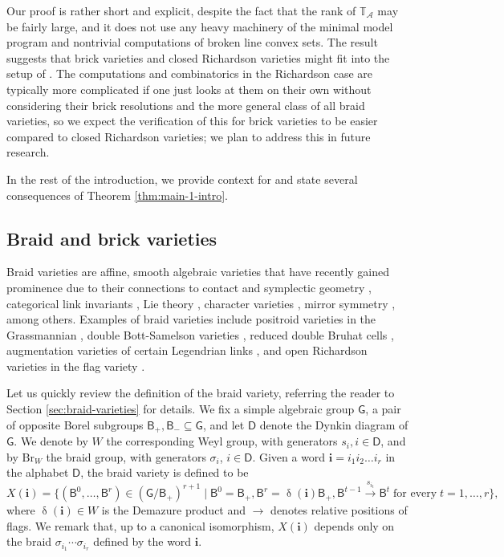 \documentclass[a4paper, 11pt]{amsart}
\newcommand{\Br}{\mathrm{Br}}
\newcommand{\borel}{\mathsf{B}}
\newcommand{\flag}[1]{\mathsf{B}^{#1}}
\newcommand{\rel}[1]{\xrightarrow{#1}}
\newcommand{\word}[1]{\mathbf{#1}}
\DeclareMathOperator{\dem}{\delta}
\newcommand{\group}{\mathsf{G}}
\newcommand{\dynkin}{\mathsf{D}}
\newcommand{\dil}[1]{\mathbb{T}_{#1}}
\theoremstyle{definition}
\begin{document}
Our proof is rather short and explicit, despite the fact that the rank of $\dil{\mathcal{A}}$ may be fairly large, and it does not use any heavy machinery of the minimal model program and nontrivial computations of broken line convex sets. The result suggests that brick varieties and closed Richardson varieties might fit into the setup of \cite{GHKK, BCMNC}. The computations and combinatorics in the Richardson case are typically more complicated if one just looks at them on their own without considering their brick resolutions and the more general class of all braid varieties, so we expect the verification of this for brick varieties to be easier compared to closed Richardson varieties; we plan to address this in future research.

In the rest of the introduction, we provide context for and state several consequences of Theorem \ref{thm:main-1-intro}.

\subsection{Braid and brick varieties} Braid varieties are affine, smooth algebraic varieties that have recently gained prominence due to their connections to contact and symplectic geometry \cite{ACSHLLW, CasalsWeng, CGGS1}, categorical link invariants \cite{CGGS2, Trinh}, Lie theory \cite{CGGLSS}, character varieties \cite{Mellit-character}, mirror symmetry \cite{CGGLSS, CGSS}, among others. Examples of braid varieties include positroid varieties in the Grassmannian \cite{GalashinLam-positroid}, double Bott-Samelson varieties \cite{SW}, reduced double Bruhat cells \cite{FominZelevinsky-Bruhat}, augmentation varieties of certain Legendrian links \cite{CGGS1}, and open Richardson varieties in the flag variety \cite{CGGLSS}. 

Let us quickly review the definition of the braid variety, referring the reader to Section \ref{sec:braid-varieties} for details. We fix a simple algebraic group $\group$, a pair of opposite Borel subgroups $\borel_{+}, \borel_{-} \subseteq \group$, and let $\dynkin$ denote the Dynkin diagram of $\group$. We denote by $W$ the corresponding Weyl group, with generators $s_{i}, i \in \dynkin$, and by $\Br_W$ the braid group, with generators $\sigma_i$, $i \in \dynkin$. Given a word $\word{i} = i_1i_2\dots i_r$ in the alphabet $\dynkin$, the braid variety is defined to be
\[
X(\word{i}) = \{(\flag{0}, \dots, \flag{r}) \in (\group/\borel_{+})^{r+1} \mid \flag{0} = \borel_{+}, \flag{r} = \dem(\word{i})\borel_{+}, \flag{t-1} \rel{s_{i_t}} \flag{t} \; \text{for every} \; t = 1, \dots, r\},
\]
where $\dem(\word{i}) \in W$ is the Demazure product and $\rightarrow$ denotes relative positions of flags. We remark that, up to a canonical isomorphism, $X(\word{i})$ depends only on the braid $\sigma_{i_1}\cdots \sigma_{i_r}$ defined by the word $\word{i}$.
\end{document}
